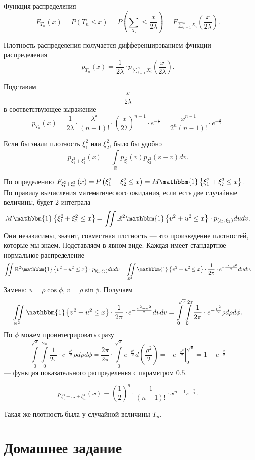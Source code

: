 Функция распределения
$$F_{T_n} \left( x \right) =
  P \left( T_n \leq x \right) =
  P \left( \sum \limits_{X_i} \leq \frac{x}{2 \lambda } \right) =
  F_{ \sum \limits_{i = 1}^n X_i} \left( \frac{x}{2 \lambda } \right).$$

Плотность распределения получается дифференцированием функции распределения
$$p_{T_n} \left( x \right) =
  \frac{1}{2 \lambda } \cdot p_{ \sum \limits_{i = 1}^n X_i} \left( \frac{x}{2 \lambda } \right).$$

Подставим
$$ \frac{x}{2 \lambda }$$
в соответствующее выражение
$$p_{T_n} \left( x \right) =
  \frac{1}{2 \lambda } \cdot \frac{ \lambda^n}{ \left( n - 1 \right)!} \cdot
  \left( \frac{x}{2 \lambda } \right)^{n - 1} \cdot e^{- \frac{x}{2}} =
  \frac{x^{n - 1}}{2^n \left( n - 1 \right)!} \cdot e^{- \frac{x}{2}}.$$

Если бы знали плотность $ \xi_1^2$ или $ \xi_2^2$, было бы удобно
$$p_{ \xi_1^2 + \xi_2^2} \left( x \right) =
  \int \limits_{ \mathbb{R}} p_{ \xi_1^2} \left( v \right) p_{ \xi_2^2} \left( x - v \right) dv.$$

По определению
$F_{ \xi_1^2 + \xi_2^2} \left( x \right) =
  P \left( \xi_1^2 + \xi_2^2 \leq x \right) =
  M \mathbbm{1} \left\{ \xi_1^2 + \xi_2^2 \leq x \right\}$.
По правилу вычисления математического ожидания, если есть две случайные величины, будет 2 интеграла
$$M \mathbbm{1} \left\{ \xi_1^2 + \xi_2^2 \leq x \right\} =
  \iint \limits{ \mathbb{R}^2}
    \mathbbm{1} \left\{ v^2 + u^2 \leq x \right\} \cdot p_{ \left( \xi_1, \xi_2 \right) }
  dudv.$$
Они независимы, значит, совместная плотность --- это произведение плотностей, которые мы знаем.
Подставляем в явном виде.
Каждая имеет стандартное нормальное распределение
$$ \iint \limits{ \mathbb{R}^2}
    \mathbbm{1} \left\{ v^2 + u^2 \leq x \right\} \cdot p_{ \left( \xi_1, \xi_2 \right) }
  dudv =
  \iint \limits_{ \mathbb{R}^2}
    \mathbbm{1} \left\{ v^2 + u^2 \leq x \right\} \cdot \frac{1}{2 \pi } \cdot
    e^{- \frac{v^2 + u^2}{2}}
  dudv.$$
Замена: $u = \rho \cos \phi, \, v = \rho \sin \phi$.
Получаем
$$ \iint \limits_{ \mathbb{R}^2}
    \mathbbm{1} \left\{ v^2 + u^2 \leq x \right\} \cdot \frac{1}{2 \pi } \cdot
    e^{- \frac{v^2 + u^2}{2}}
  dudv =
  \int \limits_0^{ \sqrt{x}}
    \int \limits_0^{2 \pi } \frac{1}{2 \pi } \cdot e^{- \frac{ \rho^2}{2}} \rho d \rho
  d \phi.$$
По $ \phi $ можем проинтегрировать сразу
$$ \int \limits_0^{ \sqrt{x}}
    \int \limits_0^{2 \pi } \frac{1}{2 \pi } \cdot e^{- \frac{ \rho^2}{2}} \rho d \rho
  d \phi =
  \frac{2 \pi }{2 \pi } \cdot
  \int \limits_0^{ \sqrt{x}} e^{- \frac{ \rho^2}{2}} d \left( \frac{ \rho^2}{2} \right) =
  \left. -e^{- \frac{ \rho^2}{2}} \right|_0^{ \sqrt{x}} =
  1 - e^{- \frac{x}{2}}$$
--- функция показательного распределения с параметром $0.5$.

$$p_{ \xi_1^2 + \dotsc + \xi_n^2} \left( x \right) =
  \left( \frac{1}{2} \right)^n \cdot \frac{1}{ \left( n - 1 \right)!} \cdot
  x^{n - 1} e^{- \frac{x}{2}}.$$

Такая же плотность была у случайной величины $T_n$.

\section*{Домашнее задание}
